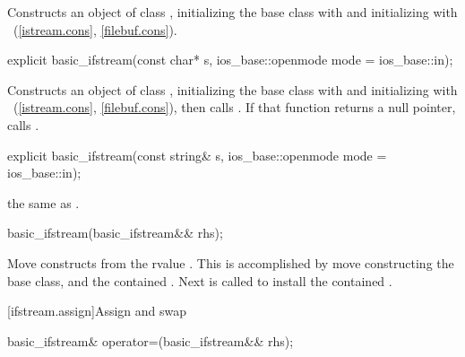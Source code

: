 \begin{itemdescr}
\pnum
\effects
Constructs an object of class
,
initializing the base class with
and initializing  with
~(\ref{istream.cons},
\ref{filebuf.cons}).
\end{itemdescr}

%
\begin{itemdecl}
explicit basic_ifstream(const char* s,
    ios_base::openmode mode = ios_base::in);
\end{itemdecl}

\begin{itemdescr}
\pnum
\effects
Constructs an object of class
,
initializing the base class with
and initializing  with
~(\ref{istream.cons},
\ref{filebuf.cons}),
then calls
.
If that function returns a null pointer, calls
.
\end{itemdescr}

%
\begin{itemdecl}
explicit basic_ifstream(const string& s,
    ios_base::openmode mode = ios_base::in);
\end{itemdecl}

\begin{itemdescr}
\pnum
\effects the same as .
\end{itemdescr}

%
\begin{itemdecl}
basic_ifstream(basic_ifstream&& rhs);
\end{itemdecl}

\begin{itemdescr}
\pnum
\effects Move constructs from the rvalue . This
is accomplished by move constructing the base class, and the contained
. Next
 is called to install
the contained .
\end{itemdescr}

[ifstream.assign]{Assign and swap}

%
%
\begin{itemdecl}
basic_ifstream& operator=(basic_ifstream&& rhs);
\end{itemdecl}


